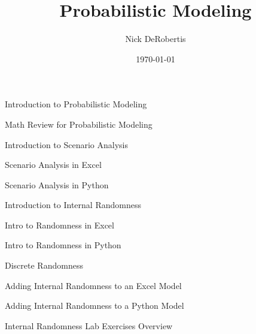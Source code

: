 \documentclass[]{article}
\begin{document}
\title{Probabilistic Modeling}
\author{Nick DeRobertis}
\date{\today}
\maketitle
\begin{section}{Introduction to Probabilistic Modeling}

\end{section}
\begin{section}{Math Review for Probabilistic Modeling}

\end{section}
\begin{section}{Introduction to Scenario Analysis}

\end{section}
\begin{section}{Scenario Analysis in Excel}

\end{section}
\begin{section}{Scenario Analysis in Python}

\end{section}
\begin{section}{Introduction to Internal Randomness}

\end{section}
\begin{section}{Intro to Randomness in Excel}

\end{section}
\begin{section}{Intro to Randomness in Python}

\end{section}
\begin{section}{Discrete Randomness}

\end{section}
\begin{section}{Adding Internal Randomness to an Excel Model}

\end{section}
\begin{section}{Adding Internal Randomness to a Python Model}

\end{section}
\begin{section}{Internal Randomness Lab Exercises Overview}

\end{section}
\end{document}
